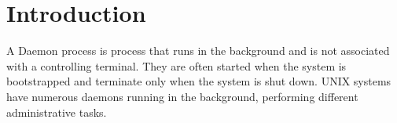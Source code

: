 \documentclass[12pt]{article} %
\newcommand{\HRule}{\rule{\linewidth}{0.5mm}}
\begin{document}
%
%
%
%
%
%
%
%
%
%
%
%
%
%
%
%
%
%
%
%
\setcounter{secnumdepth}{1}
\section{Introduction}
A Daemon process is process that runs in the background and is not associated with a controlling terminal. They are often started when the system is bootstrapped and terminate only when the system is shut down. UNIX systems have numerous daemons running in the background, performing different administrative tasks.
\end{document}
